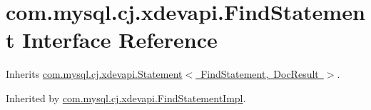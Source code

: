 \hypertarget{interfacecom_1_1mysql_1_1cj_1_1xdevapi_1_1_find_statement}{}\section{com.\+mysql.\+cj.\+xdevapi.\+Find\+Statement Interface Reference}
\label{interfacecom_1_1mysql_1_1cj_1_1xdevapi_1_1_find_statement}


Inherits \mbox{\hyperlink{interfacecom_1_1mysql_1_1cj_1_1xdevapi_1_1_statement}{com.\+mysql.\+cj.\+xdevapi.\+Statement$<$ Find\+Statement, Doc\+Result $>$}}.



Inherited by \mbox{\hyperlink{classcom_1_1mysql_1_1cj_1_1xdevapi_1_1_find_statement_impl}{com.\+mysql.\+cj.\+xdevapi.\+Find\+Statement\+Impl}}.

